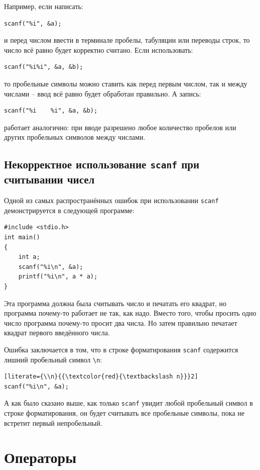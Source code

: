 \documentclass[10pt]{article}
\begin{document}
Например, если написать:
\begin{lstlisting}
scanf("%i", &a);
\end{lstlisting}
и перед числом ввести в терминале пробелы, табуляции или переводы строк, то число всё равно будет корректно считано. Если использовать:
\begin{lstlisting}
scanf("%i%i", &a, &b);
\end{lstlisting}
то пробельные символы можно ставить как перед первым числом, так и между числами -- ввод всё равно будет обработан правильно. А запись:
\begin{lstlisting}
scanf("%i    %i", &a, &b);
\end{lstlisting}
работает аналогично: при вводе разрешено любое количество пробелов или других пробельных символов между числами.


\subsection*{Некорректное использование \texttt{scanf} при считывании чисел}
Одной из самых распространённых ошибок при использовании \texttt{scanf} демонстрируется в следующей программе:
\begin{lstlisting}
#include <stdio.h>
int main()
{
    int a;
    scanf("%i\n", &a);
    printf("%i\n", a * a);
}
\end{lstlisting}
Эта программа должна была считывать число и печатать его квадрат, но программа почему-то работает не так, как надо. Вместо того, чтобы просить одно число программа почему-то просит два числа. Но затем правильно печатает квадрат первого введённого числа.

\noindent Ошибка заключается в том, что в строке форматирования \texttt{scanf} содержится лишний пробельный символ \texttt{\textbackslash n}:
\begin{lstlisting}[literate={\\n}{{\textcolor{red}{\textbackslash n}}}2]
scanf("%i\n", &a);
\end{lstlisting}
А как было сказано выше, как только \texttt{scanf} увидит любой пробельный символ в строке форматирования, он будет считывать все пробельные символы, пока не встретит первый непробельный.


\newpage
\section*{Операторы}
\end{document}
